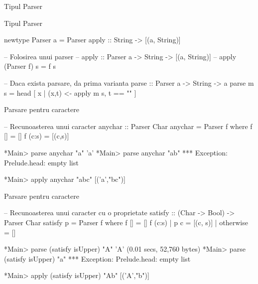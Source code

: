 \documentclass[xcolor=x11names,compress,10pt]{beamer}
\begin{document}
\begin{frame}[fragile]{Tipul Parser}

\begin{block}{Tipul Parser}
\begin{asciihs}
  
  newtype Parser a =
    Parser { apply :: String -> [(a, String)] }
\end{asciihs}
\end{block}

\begin{asciihs}
  -- Folosirea unui parser 
  -- apply :: Parser a -> String -> [(a, String)]
  -- apply (Parser f) s = f s

  -- Daca exista parsare, da prima varianta
  parse :: Parser a -> String -> a
  parse m s = head [ x | (x,t) <- apply m s, t == "" ]
\end{asciihs}
\end{frame}










%

\begin{frame}[fragile]{Parsare pentru caractere}
\begin{asciihs}
  -- Recunoasterea unui caracter
  anychar :: Parser Char
  anychar = Parser f
    where
    f []     = []
    f (c:s) = [(c,s)]
\end{asciihs}
\pause

\begin{asciihs}
*Main> parse anychar "a"
'a'
*Main> parse anychar "ab"
*** Exception: Prelude.head: empty list

*Main> apply anychar "abc"
[('a',"bc")]
\end{asciihs}
\end{frame}

\begin{frame}[fragile]{Parsare pentru caractere}
\begin{asciihs}
 -- Recunoasterea unui caracter cu o proprietate
  satisfy :: (Char -> Bool) -> Parser Char
  satisfy p = Parser f
    where
    f []                 = []
    f (c:s) | p c        = [(c, s)]
            | otherwise = []
\end{asciihs}
\pause 
\begin{asciihs}
*Main> parse (satisfy isUpper) "A"
'A'
(0.01 secs, 52,760 bytes)
*Main> parse (satisfy isUpper) "a"
*** Exception: Prelude.head: empty list

*Main> apply (satisfy isUpper) "Ab"
[('A',"b")]
\end{asciihs}
\end{frame}
\end{document}
